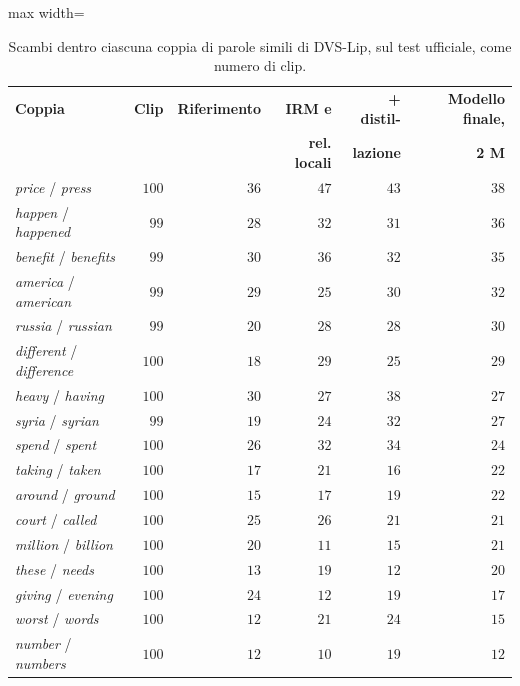 \begin{table}[ht]
\centering
\small
\renewcommand{\arraystretch}{1.1}
\caption[Scambi dentro le coppie di parole simili di DVS-Lip]{Scambi dentro ciascuna coppia di parole simili di DVS-Lip, sul test ufficiale, come numero di clip.}
\label{tab:coppie_estese}
\begin{adjustbox}{max width=\textwidth}
\begin{tabular}{@{}l r r r r r@{}}
\hline
\textbf{Coppia} & \textbf{Clip} & \textbf{Riferimento} & \textbf{IRM e} & \textbf{+ distil-} & \textbf{Modello finale,} \\
 & & & \textbf{rel. locali} & \textbf{lazione} & \textbf{2 M} \\
\hline
\emph{price} / \emph{press} & $100$ & $36$ & $47$ & $43$ & $38$ \\
\emph{happen} / \emph{happened} & $99$ & $28$ & $32$ & $31$ & $36$ \\
\emph{benefit} / \emph{benefits} & $99$ & $30$ & $36$ & $32$ & $35$ \\
\emph{america} / \emph{american} & $99$ & $29$ & $25$ & $30$ & $32$ \\
\emph{russia} / \emph{russian} & $99$ & $20$ & $28$ & $28$ & $30$ \\
\emph{different} / \emph{difference} & $100$ & $18$ & $29$ & $25$ & $29$ \\
\emph{heavy} / \emph{having} & $100$ & $30$ & $27$ & $38$ & $27$ \\
\emph{syria} / \emph{syrian} & $99$ & $19$ & $24$ & $32$ & $27$ \\
\emph{spend} / \emph{spent} & $100$ & $26$ & $32$ & $34$ & $24$ \\
\emph{taking} / \emph{taken} & $100$ & $17$ & $21$ & $16$ & $22$ \\
\emph{around} / \emph{ground} & $100$ & $15$ & $17$ & $19$ & $22$ \\
\emph{court} / \emph{called} & $100$ & $25$ & $26$ & $21$ & $21$ \\
\emph{million} / \emph{billion} & $100$ & $20$ & $11$ & $15$ & $21$ \\
\emph{these} / \emph{needs} & $100$ & $13$ & $19$ & $12$ & $20$ \\
\emph{giving} / \emph{evening} & $100$ & $24$ & $12$ & $19$ & $17$ \\
\emph{worst} / \emph{words} & $100$ & $12$ & $21$ & $24$ & $15$ \\
\emph{number} / \emph{numbers} & $100$ & $12$ & $10$ & $19$ & $12$ \\

\end{tabular}
\end{adjustbox}
\end{table}
